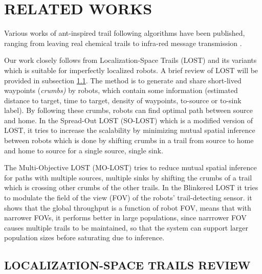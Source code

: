 \documentclass[letterpaper, 10 pt, conference]{ieeeconf}  %
\begin{document}
\section{RELATED WORKS}
Various works of ant-inspired trail following algorithms have been published, ranging from leaving real chemical trails \cite{RussellOdour1994} to infra-red message transmission \cite{payton2001pheromone}. 

Our work closely follows from Localization-Space Trails (LOST) \cite{LOST} and its variants which is suitable for imperfectly localized robots. A brief review of LOST will be provided in subsection \ref{ssection:LOST_review}. The method is to generate and share short-lived waypoints (\emph{crumbs)} by robots, which contain some information (estimated distance to target, time to target, density of waypoints, to-source or to-sink label). By following these crumbs, robots can find optimal path between source and home. In the Spread-Out LOST (SO-LOST) \cite{SO_LOST} which is a modified version of LOST, it tries to increase the scalability by minimizing mutual spatial inference between robots which is done by shifting crumbs in a trail from source to home and home to source for a single source, single sink. 

The Multi-Objective LOST (MO-LOST) \cite{MO_LOST} tries to reduce mutual spatial inference for paths with multiple sources, multiple sinks by shifting the crumbs of a trail which is crossing other crumbs of the other trails. In the Blinkered LOST \cite{BLINKERED_LOST} it tries to modulate the field of the view (FOV) of the robots' trail-detecting sensor. it shows that the global throughput is a function of robot FOV, means that with narrower FOVs, it performs better in large populations, since narrrower FOV causes multiple trails to be maintained, so that the system can support larger population sizes before saturating due to inference.

\subsection{LOCALIZATION-SPACE TRAILS REVIEW} \label{ssection:LOST_review}
\end{document}
